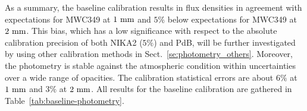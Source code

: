 As a summary, the baseline calibration results in flux densities in
agreement with expectations for MWC349 at $1~\rm{mm}$ and $5\%$ below
expectations for MWC349 at $2~\rm{mm}$. This bias, which has a low
significance with respect to the absolute calibration precision of
both NIKA2 ($5\%$) and PdB, will be further investigated by using other
calibration methods in Sect.~\ref{se:photometry_others}. Moreover, the
photometry is stable against the atmospheric condition within
uncertainties over a wide range of opacities. The calibration
statistical errors are about $6\%$ at $1~\rm{mm}$ and $3\%$ at
$2~\rm{mm}$. All results for the baseline calibration are gathered in
Table~\ref{tab:baseline-photometry}.



